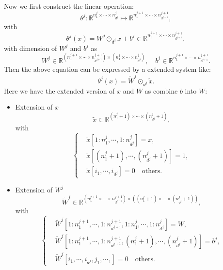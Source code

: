 Now we first construct the linear operation:
$$
\theta^j: \mathbb{R}^{ n^j_1\times \cdots \times n^j_{d^{j}} } \mapsto  \mathbb{R}^{ n^{j+1}_1\times \cdots \times n^{j+1}_{d^{j+1}} },
$$
with
\begin{equation}\label{DNN_tensor_affinemap}
\theta^j(x) =  W^j \odot_{d^j} x + b^j \in \mathbb R^{n^{j+1}_1 \times \cdots \times  n^{j+1}_{d^{j+1}}},
\end{equation}
with dimension of $W^j$ and $b^j$ as
\begin{equation}\label{space:W&b}
W^j \in \mathbb{R}^{ \left(n^{j+1}_1 \times \cdots \times n^{j+1}_{d^{j+1}}\right) \times \left(n^j_1\times \cdots \times n^j_{d^{j}}\right) }, \quad b^j \in \mathbb R^{n^{j+1}_1 \times \cdots \times  n^{j+1}_{d^{j+1}}}.
\end{equation}
Then the above equation can be expressed by a extended system like:
\begin{equation}\label{DNN:extend}
\theta^j(x) = \tilde W^j \odot_{d^j} \tilde x.
\end{equation}
Here we have the extended version of $x$ and $W$ as combine $b$ into $W$:
\begin{itemize}
	\item Extension of $x$
\begin{equation}\label{space:extend^x}
\tilde x  \in \mathbb{R}^{ (n^j_1 + 1)\times \cdots \times (n^j_{d^{j}} + 1) },
\end{equation}
with 
\begin{equation}\label{form:extend^x}
\begin{cases}
&\tilde x[1:n^j_{1},\cdots,1:n^{j}_{d^{j}}] = x, \\
 &\tilde x[(n^j_1 + 1), \cdots, (n^j_{d^{j}} + 1) ] = 1, \\
 &\tilde x[i_1,\cdots,i_{d^j}] = 0 \quad \text{others}.
\end{cases}
\end{equation}
	\item Extension of $W^j$
\begin{equation}\label{space:extend^W}
\tilde W^j  \in \mathbb{R}^{ \left(n^{j+1}_1 \times \cdots \times n^{j+1}_{d^{j+1}}\right) \times \left((n^j_1 + 1)\times \cdots \times (n^j_{d^{j}} + 1)\right) },
\end{equation}
with 
\begin{equation}\label{form:extend^W}
\begin{cases}
&\tilde W^j[1:n^{j+1}_1,\cdots,1:n^{j+1}_{d^{j+1}},1:n^j_{1},\cdots,1:n^{j}_{d^{j}}] = W, \\
&\tilde W^j[1:n^{j+1}_1,\cdots,1:n^{j+1}_{d^{j+1}},(n^j_1 + 1), \cdots, (n^j_{d^{j}} + 1) ] = b^j, \\
&\tilde W^j[i_1,\cdots,i_{d^j},j_1,\cdots,] = 0 \quad \text{others}.
\end{cases}
\end{equation}
\end{itemize}

